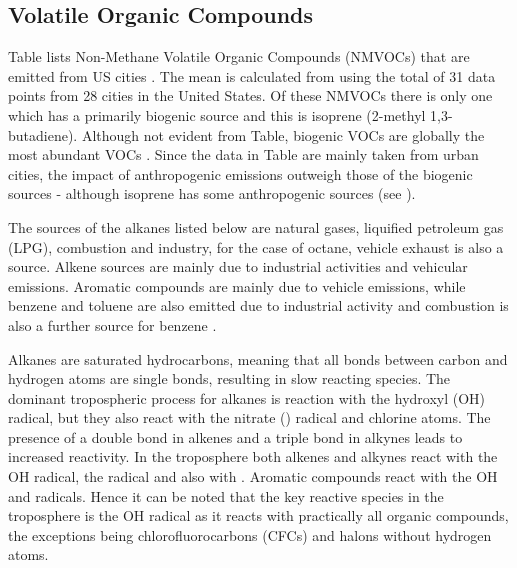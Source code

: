 \subsection{Volatile Organic Compounds}
Table lists Non-Methane Volatile Organic Compounds (NMVOCs) that are emitted from US cities \citep{Baker:2008}. 
The mean is calculated from \citep{Baker:2008} using the total of 31 data points from 28 cities in the United States. 
Of these NMVOCs there is only one which has a primarily biogenic source and this is isoprene (2-methyl 1,3-butadiene). 
Although not evident from Table, biogenic VOCs are globally the most abundant VOCs \citep{Goldstein:2007}. 
Since the data in Table are mainly taken from urban cities, the impact of anthropogenic emissions outweigh those of the biogenic sources \citep{Baker:2008} - although isoprene has some anthropogenic sources (see \citep{Borbon:2003}). 

The sources of the alkanes listed below are natural gases, liquified petroleum gas (LPG), combustion and industry, for the case of octane, vehicle exhaust is also a source. 
Alkene sources are mainly due to industrial activities and vehicular emissions. 
Aromatic compounds are mainly due to vehicle emissions, while benzene and toluene are also emitted due to industrial activity and combustion is also a further source for benzene \citep{Arsene:2009}.

Alkanes are saturated hydrocarbons, meaning that all bonds between carbon and hydrogen atoms are single bonds, resulting in slow reacting species. 
The dominant tropospheric process for alkanes is reaction with the hydroxyl (OH) radical, but they also react with the nitrate () radical and chlorine atoms. 
The presence of a double bond in alkenes and a triple bond in alkynes leads to increased reactivity. 
In the troposphere both alkenes and alkynes react with the OH radical, the  radical and also with . 
Aromatic compounds react with the OH and  radicals. 
Hence it can be noted that the key reactive species in the troposphere is the OH radical as it reacts with practically all organic compounds, the exceptions being chlorofluorocarbons (CFCs) and halons without hydrogen atoms. 

